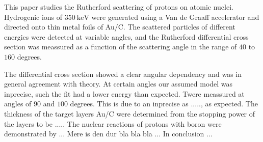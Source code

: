 This paper studies the Rutherford scattering of protons on atomic
nuclei. Hydrogenic ions of $\SI{350}{\kilo\electronvolt}$ were generated using
a Van de Graaff accelerator and directed onto thin metal foils of Au/C. The
scattered particles of different energies were detected at variable angles,
and the Rutherford differential cross section was meassured as a function of
the scattering angle in the range of $40$ to $160$ degrees. 

The differential cross section showed a clear angular dependency and was in
general agreement with theory. At certain angles our assumed model was
inprecise, such the fit had a lower energy than expected. Twere meassured at
angles of $90$ and $100$ degrees. This is due to an inprecise as ....., as expected.
The thickness of the target layers Au/C were determined from the stopping power
of the layers to be ..... The nuclear reactions of protons with boron were
demonstrated by ... 
Mere is den dur bla bla bla ... 
In conclusion ... 


